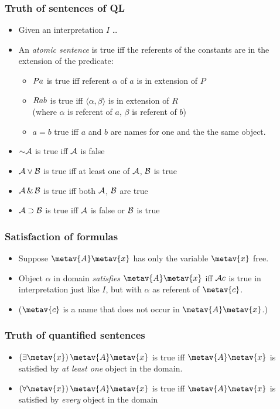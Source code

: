 \begin{frame}
  \frametitle{Truth of sentences of QL}

  \begin{itemize}[<+->]
    \item Given an interpretation $I$ \dots
    \item An \emph{atomic sentence} is true iff the referents of the constants are in the extension of the predicate:
    \begin{itemize}
    \item $Pa$ is true iff referent $\alpha$ of $a$ is in extension of $P$
    \item $Rab$ is true iff $\langle \alpha,\beta\rangle$ is in extension of $R$\\
    (where $\alpha$ is referent of $a$, $\beta$ is referent of $b$)
    \item $a=b$ true iff $a$ and $b$ are names for one and the the same object.
    \end{itemize}
    \item $\enot\metav{A}$ is true iff $\mathcal{A}$ is false
    \item $\mathcal{A} \vee \mathcal{B}$ is true iff at least one of $\mathcal{A}$, $\mathcal{B}$ is true
    \item $\mathcal{A} \,\&\, \mathcal{B}$ is true iff both $\mathcal{A}$, $\mathcal{B}$ are true
    \item $\mathcal{A} \supset \mathcal{B}$ is true iff $\mathcal{A}$ is false or $\mathcal{B}$ is true
  \end{itemize}
\end{frame}

\begin{frame}
  \frametitle{Satisfaction of formulas}

  \begin{itemize}[<+->]
    \item Suppose $\metav{A}\qv{\metav{x}}$ has only the variable $\metav{x}$
    free.
    \item Object $\alpha$ in domain \emph{satisfies} $\metav{A}\qv{\metav{x}}$ iff $\mathcal{A}c$ is true in interpretation just like $I$, but with $\alpha$ as referent of $\metav{c}$.
    \item ($\metav{c}$ is a name that does not occur in $\metav{A}\qv{\metav{x}}$.)
  \end{itemize}
\end{frame}

\begin{frame}
  \frametitle{Truth of quantified sentences}

  \begin{itemize}[<+->]
    \item $\qt{\exists}{\metav{x}}\,\metav{A}\qv{\metav{x}}$ is true iff $\metav{A}\qv{\metav{x}}$ is satisfied by \emph{at least one} object in the domain.
    \item $\qt{\forall}{\metav{x}}\,\metav{A}\qv{\metav{x}}$ is true iff $\metav{A}\qv{\metav{x}}$ is satisfied by \emph{every} object in the domain
  \end{itemize}
\end{frame}

